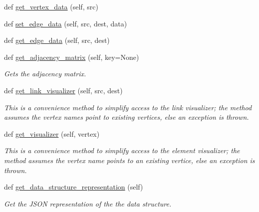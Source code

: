 \begin{DoxyCompactItemize}
def \hyperlink{classbridges_1_1graph__adj__matrix_1_1_graph_adj_matrix_a6ae3c6fbe98c554ba976ef095a77871b}{get\+\_\+vertex\+\_\+data} (self, src)
\item 
def \hyperlink{classbridges_1_1graph__adj__matrix_1_1_graph_adj_matrix_ac456de9923ee8d671d1b6d908568b1bc}{set\+\_\+edge\+\_\+data} (self, src, dest, data)
\item 
def \hyperlink{classbridges_1_1graph__adj__matrix_1_1_graph_adj_matrix_aa3b7bc3f06d00e9a67f8d1cf6793ad70}{get\+\_\+edge\+\_\+data} (self, src, dest)
\item 
def \hyperlink{classbridges_1_1graph__adj__matrix_1_1_graph_adj_matrix_aa64d4ed1525c6b4959269df0e4090e01}{get\+\_\+adjacency\+\_\+matrix} (self, key=None)
\begin{DoxyCompactList}\small\item\em Gets the adjacency matrix. \end{DoxyCompactList}\item 
def \hyperlink{classbridges_1_1graph__adj__matrix_1_1_graph_adj_matrix_a7071cdb99fdd2afd558d19f1470b8c9f}{get\+\_\+link\+\_\+visualizer} (self, src, dest)
\begin{DoxyCompactList}\small\item\em This is a convenience method to simplify access to the link visualizer; the method assumes the vertex names point to existing vertices, else an exception is thrown. \end{DoxyCompactList}\item 
def \hyperlink{classbridges_1_1graph__adj__matrix_1_1_graph_adj_matrix_a96177ddfba9e474543b03d58fbc37e40}{get\+\_\+visualizer} (self, vertex)
\begin{DoxyCompactList}\small\item\em This is a convenience method to simplify access to the element visualizer; the method assumes the vertex name points to an existing vertice, else an exception is thrown. \end{DoxyCompactList}\item 
def \hyperlink{classbridges_1_1graph__adj__matrix_1_1_graph_adj_matrix_a9e8f53fc0dcd724bb29502fe08ea837e}{get\+\_\+data\+\_\+structure\+\_\+representation} (self)
\begin{DoxyCompactList}\small\item\em Get the J\+S\+ON representation of the the data structure. \end{DoxyCompactList}\end{DoxyCompactItemize}


